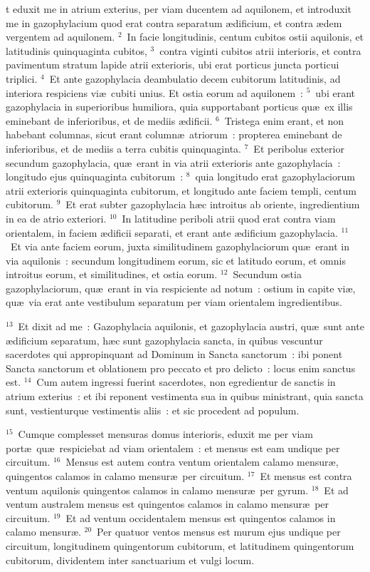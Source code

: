 \bchapter
{}t eduxit me in atrium exterius, per viam ducentem ad aquilonem, et introduxit me in gazophylacium quod erat contra separatum \ae dificium, et contra \ae dem vergentem ad aquilonem.
${}^{2}$~In facie longitudinis, centum cubitos ostii aquilonis, et latitudinis quinquaginta cubitos,
${}^{3}$~contra viginti cubitos atrii interioris, et contra pavimentum stratum lapide atrii exterioris, ubi erat porticus juncta porticui triplici.
${}^{4}$~Et ante gazophylacia deambulatio decem cubitorum latitudinis, ad interiora respiciens vi\ae\ cubiti unius. Et ostia eorum ad aquilonem~:
${}^{5}$~ubi erant gazophylacia in superioribus humiliora, quia supportabant porticus qu\ae\ ex illis eminebant de inferioribus, et de mediis \ae dificii.
${}^{6}$~Tristega enim erant, et non habebant columnas, sicut erant column\ae\ atriorum~: propterea eminebant de inferioribus, et de mediis a terra cubitis quinquaginta.
${}^{7}$~Et peribolus exterior secundum gazophylacia, qu\ae\ erant in via atrii exterioris ante gazophylacia~: longitudo ejus quinquaginta cubitorum~:
${}^{8}$~quia longitudo erat gazophylaciorum atrii exterioris quinquaginta cubitorum, et longitudo ante faciem templi, centum cubitorum.
${}^{9}$~Et erat subter gazophylacia h\ae c introitus ab oriente, ingredientium in ea de atrio exteriori.
${}^{10}$~In latitudine periboli atrii quod erat contra viam orientalem, in faciem \ae dificii separati, et erant ante \ae dificium gazophylacia.
${}^{11}$~Et via ante faciem eorum, juxta similitudinem gazophylaciorum qu\ae\ erant in via aquilonis~: secundum longitudinem eorum, sic et latitudo eorum, et omnis introitus eorum, et similitudines, et ostia eorum.
${}^{12}$~Secundum ostia gazophylaciorum, qu\ae\ erant in via respiciente ad notum~: ostium in capite vi\ae , qu\ae\ via erat ante vestibulum separatum per viam orientalem ingredientibus.


${}^{13}$~Et dixit ad me~: Gazophylacia aquilonis, et gazophylacia austri, qu\ae\ sunt ante \ae dificium separatum, h\ae c sunt gazophylacia sancta, in quibus vescuntur sacerdotes qui appropinquant ad Dominum in Sancta sanctorum~: ibi ponent Sancta sanctorum et oblationem pro peccato et pro delicto~: locus enim sanctus est.
${}^{14}$~Cum autem ingressi fuerint sacerdotes, non egredientur de sanctis in atrium exterius~: et ibi reponent vestimenta sua in quibus ministrant, quia sancta sunt, vestienturque vestimentis aliis~: et sic procedent ad populum.


${}^{15}$~Cumque complesset mensuras domus interioris, eduxit me per viam port\ae\ qu\ae\ respiciebat ad viam orientalem~: et mensus est eam undique per circuitum.
${}^{16}$~Mensus est autem contra ventum orientalem calamo mensur\ae , quingentos calamos in calamo mensur\ae\ per circuitum.
${}^{17}$~Et mensus est contra ventum aquilonis quingentos calamos in calamo mensur\ae\ per gyrum.
${}^{18}$~Et ad ventum australem mensus est quingentos calamos in calamo mensur\ae\ per circuitum.
${}^{19}$~Et ad ventum occidentalem mensus est quingentos calamos in calamo mensur\ae .
${}^{20}$~Per quatuor ventos mensus est murum ejus undique per circuitum, longitudinem quingentorum cubitorum, et latitudinem quingentorum cubitorum, dividentem inter sanctuarium et vulgi locum.

